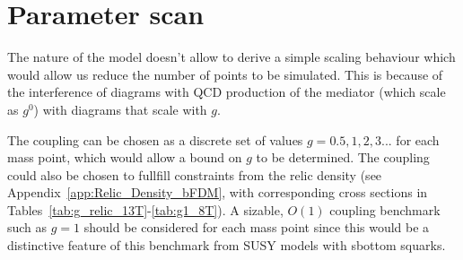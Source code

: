 \section{Parameter scan}

The nature of the model doesn't allow to derive a simple scaling behaviour which would allow us reduce the number of points to be simulated. This is because of the interference of diagrams with QCD production of the mediator (which scale as $g^0$) with diagrams that scale with $g$.~

The coupling can be chosen as a discrete set of values $g=0.5,1,2,3...$ for each mass point, which would allow a bound on $g$ to be determined.  The coupling could also be chosen to fullfill constraints from the relic density (see Appendix~\ref{app:Relic_Density_bFDM}, with corresponding cross sections in Tables~\ref{tab:g_relic_13T}-\ref{tab:g1_8T}). A sizable, $O(1)$ coupling benchmark such as $g=1$ should be considered for each mass point since this would be a distinctive feature of this benchmark from SUSY models with sbottom squarks.

